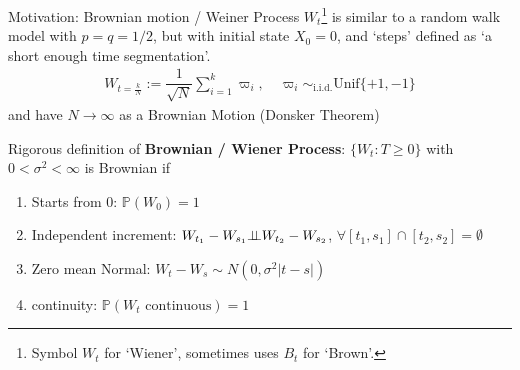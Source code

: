 Motivation: Brownian motion / Weiner Process $ W_t $\footnote{Symbol $ W_t $ for `Wiener', sometimes uses $ B_t $ for `Brown'.} is similar to a random walk model with $ p=q=1/2 $, but with initial state $ X_0=0 $, and `steps' defined as `a short enough time segmentation'.
\begin{align}
    W_{t=\frac{k}{N}}:= \dfrac{1}{\sqrt{N}} \sum_{i=1}^k \varpi _i,\quad \varpi _i\sim_{\mathrm{i.i.d.} } \mathrm{Unif}\{+1,-1\} 
\end{align}
and have $ N\to \infty $ as a Brownian Motion (Donsker Theorem)

Rigorous definition of \textbf{Brownian / Wiener Process}: $ \{W_t:T\geq 0\} $ with $ 0<\sigma ^2<\infty $ is Brownian if
\begin{enumerate}[topsep=2pt,itemsep=2pt]
    \item Starts from $ 0 $: $ \mathbb{P}\left( W_0 \right) =1 $
    \item Independent increment: $ W_{t_1}-W_{s_1}\bot\!\!\!\bot W_{t_2}-W_{s_2} $, $  \forall [t_1,s_1]\cap [t_2,s_2]=\emptyset $
    \item Zero mean Normal: $ W_t-W_s\sim N(0,\sigma ^2\vert t-s\vert) $
    \item continuity: $ \mathbb{P}\left( W_t\text{ continuous} \right) =1 $ 
\end{enumerate}

